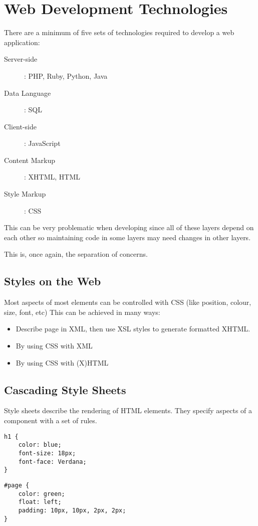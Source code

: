 \section{Web Development Technologies}\label{sec:web_development_technologies}

There are a minimum of five sets of technologies required to develop a web application:

\begin{description}
	\item[Server-side]: PHP, Ruby, Python, Java
	\item[Data Language]: SQL
	\item[Client-side]: JavaScript
	\item[Content Markup]: XHTML, HTML
	\item[Style Markup]: CSS
\end{description}
This can be very problematic when developing since all of these layers depend on each other so maintaining code in some layers may need changes in other layers.

This is, once again, the separation of concerns.

\subsection{Styles on the Web}\label{sub:styles_on_the_web}

Most aspects of most elements can be controlled with CSS (like position, colour, size, font, etc)
This can be achieved in many ways:
\begin{itemize}
	\item Describe page in XML, then use XSL styles to generate formatted XHTML.
	\item By using CSS with XML
	\item By using CSS with (X)HTML
\end{itemize}

\subsection{Cascading Style Sheets}\label{sub:cascading_style_sheets}

Style sheets describe the rendering of HTML elements.
They specify aspects of a component with a set of rules.

\medskip
\begin{minipage}{0.45\linewidth}
	\begin{verbatim}
h1 {
    color: blue;
    font-size: 18px;
    font-face: Verdana;
}
\end{verbatim}
\end{minipage}
\hfill
\begin{minipage}{0.45\linewidth}
	\begin{verbatim}
#page {
    color: green;
    float: left;
    padding: 10px, 10px, 2px, 2px;
}
\end{verbatim}
\end{minipage}

